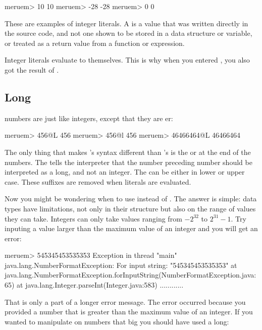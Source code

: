 \begin{REPL}
meruem> 10
10
meruem> -28
-28
meruem> 0
0
\end{REPL}

These are examples of integer literals. A  is a value that was written directly in the source code, and not one shown to be stored in a data structure or variable, or treated as a return value from a function or expression. 

Integer literals evaluate to themselves. This is why when you entered , you also got the result of . 

\subsection{Long}
 numbers are just like integers, except that they are er:

\begin{REPL}
meruem> 456@L
456
meruem> 456@l
456
meruem> 46466464@L
46466464
\end{REPL}

The only thing that makes 's syntax different than 's is the  or  at the end of the numbers. The  tells the interpreter that the number preceding number should be interpreted as a long, and not an integer. The  can be either in lower or upper case. These suffixes are removed when  literals are evaluated. 

Now you might be wondering when to use  instead of . The answer is simple: data types have limitations, not only in their structure but also on the range of values they can take. Integers can only take values ranging from $-2^{32}$ to $2^{31}-1$. Try inputing a value larger than the maximum value of an integer and you will get an error:

\begin{REPL}
meruem> 545345453535353
Exception in thread "main" java.lang.NumberFormatException: For input string: "545345453535353"
	at java.lang.NumberFormatException.forInputString(NumberFormatException.java:65)
	at java.lang.Integer.parseInt(Integer.java:583)
	............
\end{REPL}

That is only a part of a longer error message. The error occurred because you provided a number that is greater than the maximum value of an integer. If you wanted to manipulate on numbers that big you should have used a long:

